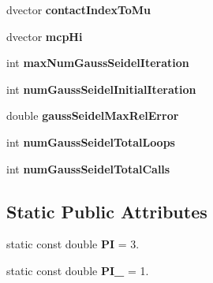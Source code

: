 \begin{DoxyCompactItemize}
\item 
\hypertarget{classOpenHRP_1_1CFSImpl_a55390b62f1e10667f987e6a58945e775}{dvector {\bfseries contact\-Index\-To\-Mu}}\label{classOpenHRP_1_1CFSImpl_a55390b62f1e10667f987e6a58945e775}

\item 
\hypertarget{classOpenHRP_1_1CFSImpl_a54896587ce9de55280754ff30bdb4a4b}{dvector {\bfseries mcp\-Hi}}\label{classOpenHRP_1_1CFSImpl_a54896587ce9de55280754ff30bdb4a4b}

\item 
\hypertarget{classOpenHRP_1_1CFSImpl_a7965c95511c330db7894c7979ab07adc}{int {\bfseries max\-Num\-Gauss\-Seidel\-Iteration}}\label{classOpenHRP_1_1CFSImpl_a7965c95511c330db7894c7979ab07adc}

\item 
\hypertarget{classOpenHRP_1_1CFSImpl_a2a3956126bf45fc6d7499dc9adaed6bd}{int {\bfseries num\-Gauss\-Seidel\-Initial\-Iteration}}\label{classOpenHRP_1_1CFSImpl_a2a3956126bf45fc6d7499dc9adaed6bd}

\item 
\hypertarget{classOpenHRP_1_1CFSImpl_a8e5d1b515218ba51893facd51cca5bc1}{double {\bfseries gauss\-Seidel\-Max\-Rel\-Error}}\label{classOpenHRP_1_1CFSImpl_a8e5d1b515218ba51893facd51cca5bc1}

\item 
\hypertarget{classOpenHRP_1_1CFSImpl_a92264e3054983d264fc9cb0b9ff020e4}{int {\bfseries num\-Gauss\-Seidel\-Total\-Loops}}\label{classOpenHRP_1_1CFSImpl_a92264e3054983d264fc9cb0b9ff020e4}

\item 
\hypertarget{classOpenHRP_1_1CFSImpl_aeef2a683ffe8c23d0c7ca469a1496754}{int {\bfseries num\-Gauss\-Seidel\-Total\-Calls}}\label{classOpenHRP_1_1CFSImpl_aeef2a683ffe8c23d0c7ca469a1496754}

\end{DoxyCompactItemize}
\subsection*{Static Public Attributes}
\begin{DoxyCompactItemize}
\item 
\hypertarget{classOpenHRP_1_1CFSImpl_a4aa5ef2ad866c44b2eff3263f82833ef}{static const double {\bfseries P\-I} = 3.}\label{classOpenHRP_1_1CFSImpl_a4aa5ef2ad866c44b2eff3263f82833ef}

\item 
\hypertarget{classOpenHRP_1_1CFSImpl_a09a3aeb6752728391b128507e8dfe73e}{static const double {\bfseries P\-I\-\_} = 1.}\label{classOpenHRP_1_1CFSImpl_a09a3aeb6752728391b128507e8dfe73e}

\end{DoxyCompactItemize}


